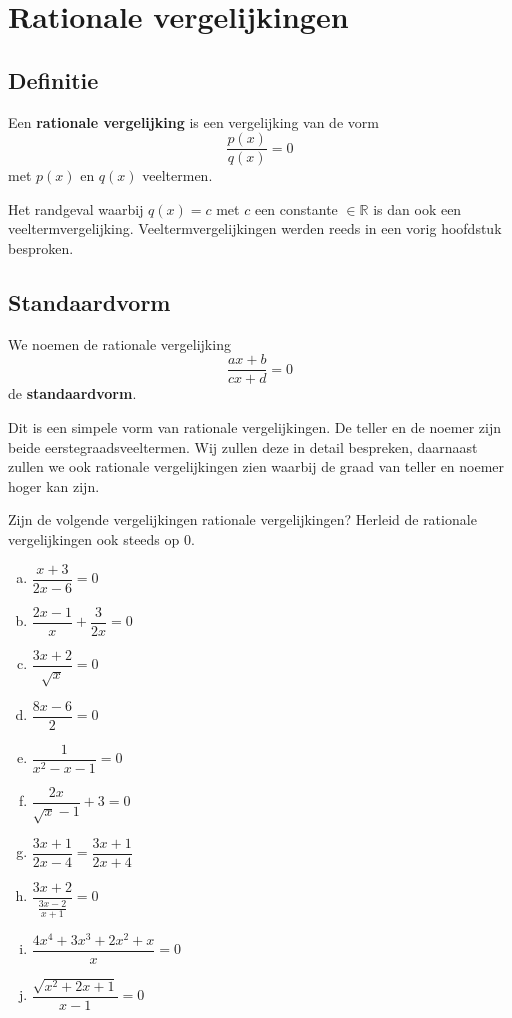 \documentclass[12pt]{article}
\begin{document}
\pagebreak
\section{Rationale vergelijkingen}

\subsection{Definitie}

\begin{mdframed}
Een {\bf rationale vergelijking} is een vergelijking van de vorm
$$\dfrac{p(x)}{q(x)}=0$$
met $p(x)$ en $q(x)$ veeltermen.
\end{mdframed}

Het randgeval waarbij $q(x)=c$ met $c$ een constante $\in \mathbb{R}$ is dan ook een veeltermvergelijking. Veeltermvergelijkingen werden reeds in een vorig hoofdstuk besproken.

\subsection{Standaardvorm}

\begin{mdframed}
We noemen de rationale vergelijking
$$\dfrac{ax+b}{cx+d}=0$$
de {\bf standaardvorm}.
\end{mdframed}
Dit is een simpele vorm van rationale vergelijkingen. De teller en de noemer zijn beide eerstegraadsveeltermen. Wij zullen deze in detail bespreken, daarnaast zullen we ook rationale vergelijkingen zien waarbij de graad van teller en noemer hoger kan zijn.

\begin{oefening}
Zijn de volgende vergelijkingen rationale vergelijkingen? Herleid de rationale vergelijkingen ook steeds op 0.\\
\begin{multicols}{2}
\begin{enumerate}[(a)]
  \itemsep1em
  \item $\dfrac{x+3}{2x-6}=0$
  \item $\dfrac{2x-1}{x}+\dfrac{3}{2x}=0$
  \item $\dfrac{3x+2}{\sqrt{x}}=0$
  \item $\dfrac{8x-6}{2}=0$
  \item $\dfrac{1}{x^2-x-1}=0$
  \item $\dfrac{2x}{\sqrt{x}-1}+3=0$
  \item $\dfrac{3x+1}{2x-4}=\dfrac{3x+1}{2x+4}$
  \item $\dfrac{3x+2}{\frac{3x-2}{x+1}}=0$
  \item $\dfrac{4x^4+3x^3+2x^2+x}{x}=0$
  \item $\dfrac{\sqrt{x^2+2x+1}}{x-1}=0$
\end{enumerate}
\end{multicols}
\end{oefening}
\end{document}

